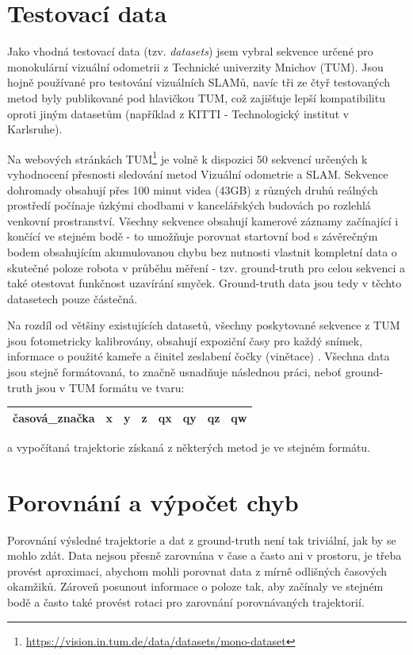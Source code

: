 \documentclass[12pt,a4paper]{report}
\begin{document}
\section{Testovací data}
Jako vhodná testovací data (tzv. \textit{datasets}) jsem vybral sekvence určené pro monokulární vizuální odometrii z Technické univerzity Mnichov (TUM). Jsou hojně používané pro testování vizuálních SLAMů, navíc tři ze čtyř testovaných metod byly publikované pod hlavičkou TUM, což zajišťuje lepší kompatibilitu oproti jiným datasetům (například z KITTI - Technologický institut v Karlsruhe). 

Na webových stránkách TUM\footnote{\url{https://vision.in.tum.de/data/datasets/mono-dataset}} je volně k dispozici 50 sekvencí určených k vyhodnocení přesnosti sledování metod Vizuální odometrie a SLAM. Sekvence dohromady obsahují přes 100 minut videa (43GB) z různých druhů reálných prostředí počínaje úzkými chodbami v kancelářských budovách po rozlehlá venkovní prostranství. Všechny sekvence obsahují kamerové záznamy začínající i končící ve stejném bodě - to umožňuje porovnat startovní bod s závěrečným bodem obsahujícím akumulovanou chybu bez nutnosti vlastnit kompletní data o skutečné poloze robota v průběhu měření - tzv. ground-truth pro celou sekvenci a také otestovat funkčnost uzavírání smyček. Ground-truth data jsou  tedy v těchto datasetech pouze částečná.

Na rozdíl od většiny existujících datasetů, všechny poskytované sekvence z TUM jsou fotometricky kalibrovány, obsahují expoziční časy pro každý snímek, informace o použité kameře a činitel zeslabení čočky (vinětace) \cite{TUM_datasets}. Všechna data jsou stejně formátovaná, to značně usnadňuje následnou práci, neboť ground-truth jsou v TUM formátu ve tvaru:

\begin{center}
\begin{tabular}{|l|l|l|l|l|l|l|l|}
\hline
časová\_značka & x & y & z & qx & qy & qz & qw \\
\hline
\end{tabular}
\end{center}
a vypočítaná trajektorie získaná z některých metod je ve stejném formátu.

\section{Porovnání a výpočet chyb}
Porovnání výsledné trajektorie a dat z ground-truth není tak triviální, jak by se mohlo zdát. Data nejsou přesně zarovnána v čase a často ani v prostoru, je třeba provést aproximaci, abychom mohli porovnat data z mírně odlišných časových okamžiků. Zároveň posunout informace o poloze tak, aby začínaly ve stejném bodě a často také provést rotaci pro zarovnání porovnávaných trajektorií.
\end{document}
